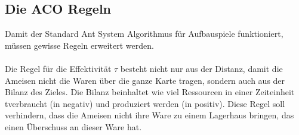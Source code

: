 \documentclass[12pt]{article}
\begin{document}
\subsection{Die ACO Regeln}\label{Regeln}
Damit der Standard Ant System Algorithmus für Aufbauspiele funktioniert, müssen gewisse Regeln erweitert werden. \\\\
Die Regel für die Effektivität $\tau$ besteht nicht nur aus der Distanz, damit die Ameisen nicht die Waren über die ganze Karte tragen, sondern auch aus der Bilanz des Zieles. Die Bilanz beinhaltet wie viel Ressourcen in einer Zeiteinheit t\footnotemark[3] verbraucht (in negativ) und produziert werden (in positiv). Diese Regel soll verhindern, dass die Ameisen nicht ihre Ware zu einem Lagerhaus bringen, das einen Überschuss an dieser Ware hat.
\end{document}
